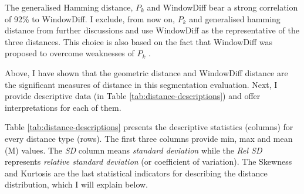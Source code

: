     The generalised Hamming distance, $P_k$ and WindowDiff bear a strong correlation of 92\% to WindowDiff. I exclude, from now on, $P_k$ and generalised hamming distance from further discussions and use WindowDiff as the representative of the three distances. This choice is also based on the fact that WindowDiff was proposed to overcome weaknesses of $P_k$ \citep[10]{pevzner2002critique}.
    
    Above, I have shown that the geometric distance and WindowDiff distance are the significant measures of distance in this segmentation evaluation. Next, I provide descriptive data (in Table \ref{tab:distance-descriptions}) and offer interpretations for each of them.
    
    \begin{table}[!ht]
    \centering
    \caption{Descriptive statistics for each set of distance measurements between corpus and parser segments}
    \label{tab:distance-descriptions}
    \end{table}

    Table \ref{tab:distance-descriptions} presents the descriptive statistics (columns) for every distance type (rows). The first three columns provide min, max and mean (M) values. The \textit{SD} column means \textit{standard deviation} while the \textit{Rel SD} represents \textit{relative standard deviation}  (or coefficient of variation). The Skewness and Kurtosis are the last statistical indicators for describing the distance distribution, which I will explain below.
    

